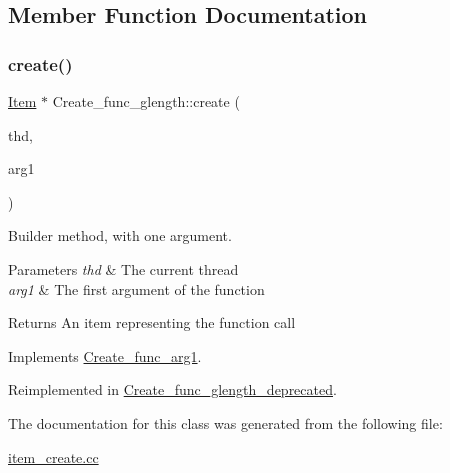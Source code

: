 \subsection{Member Function Documentation}
\mbox{\label{classCreate__func__glength_a419eeeb9fb55b66d9e21c4e7a9c7fc0d}} 
\subsubsection{\texorpdfstring{create()}{create()}}
{\footnotesize\ttfamily \mbox{\hyperlink{classItem}{Item}} $\ast$ Create\+\_\+func\+\_\+glength\+::create (\begin{DoxyParamCaption}\item[{T\+HD $\ast$}]{thd,  }\item[{\mbox{\hyperlink{classItem}{Item}} $\ast$}]{arg1 }\end{DoxyParamCaption})\hspace{0.3cm}{\ttfamily [virtual]}}

Builder method, with one argument. 
\begin{DoxyParams}{Parameters}
{\em thd} & The current thread \\
\hline
{\em arg1} & The first argument of the function \\
\hline
\end{DoxyParams}
\begin{DoxyReturn}{Returns}
An item representing the function call 
\end{DoxyReturn}


Implements \mbox{\hyperlink{classCreate__func__arg1_a3e9a98f755cd82c3e762e334c955a8c9}{Create\+\_\+func\+\_\+arg1}}.



Reimplemented in \mbox{\hyperlink{classCreate__func__glength__deprecated_a470bf648f489bdad5f2c621a0c046c9d}{Create\+\_\+func\+\_\+glength\+\_\+deprecated}}.



The documentation for this class was generated from the following file\+:\begin{DoxyCompactItemize}
\item 
\mbox{\hyperlink{item__create_8cc}{item\+\_\+create.\+cc}}\end{DoxyCompactItemize}
